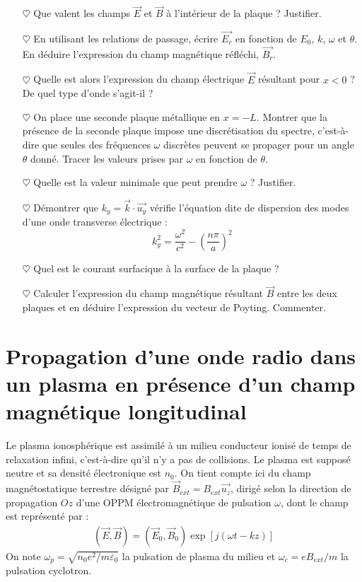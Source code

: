 \documentclass{report}
\begin{document}
\begin{itemize}
	
	\item[$\heartsuit$] Que valent les champs $\vec{E}$ et $\vec{B}$ à l'intérieur de la plaque ? Justifier.
	
	\item[$\heartsuit$] En utilisant les relations de passage, écrire $\vec{E_r}$ en fonction de $E_0$, $k$, $\omega$ et $\theta$. En déduire l'expression du champ magnétique réfléchi, $\vec{B_r}$.
	
	\item[$\heartsuit$] Quelle est alors l'expression du champ électrique $\vec{E}$ résultant pour $x<0$ ? De quel type d'onde s'agit-il ?
	
	\item[$\heartsuit$] 	On place une seconde plaque métallique en $x=-L$. Montrer que la présence de la seconde plaque impose une discrétisation du spectre, c'est-à-dire que seules des fréquences $\omega$ discrètes peuvent se propager pour un angle $\theta$ donné. Tracer les valeurs prises par $\omega$ en fonction de $\theta$. 
	\item[$\heartsuit$] Quelle est la valeur minimale que peut prendre $\omega$ ? Justifier. 
	
	\item[$\heartsuit$] Démontrer que $k_y=\vec{k}\cdot\vec{u_y}$ vérifie l'équation dite de dispersion des modes d'une onde transverse électrique : 
	\begin{equation}
		k_y^2=\frac{\omega^2}{c^2}-\left(\frac{n\pi}{a} \right)^2 
	\end{equation}
	
	\item[$\heartsuit$] Quel est le courant surfacique à la surface de la plaque ?
	
	\item[$\heartsuit$] Calculer l'expression du champ magnétique résultant $\vec{B}$ entre les deux plaques et en déduire l'expression du vecteur de Poyting. Commenter. 
	
\end{itemize}

\newpage

\section*{Propagation d'une onde radio dans un plasma en présence d'un champ magnétique longitudinal}

Le plasma ionosphérique est assimilé à un milieu conducteur ionisé de temps de relaxation infini, c'est-à-dire qu'il n'y a pas de collisions. Le plasma est supposé neutre et sa densité électronique est $n_0$. On tient compte ici du champ magnétostatique terrestre désigné par $\vec{B}_{ext}=B_{ext}\vec{u_z}$, dirigé selon la direction de propagation $Oz$ d'une OPPM électromagnétique de pulsation $\omega$, dont le champ est représenté par :
\begin{align*}
	(\vec{E},\vec{B})=(\vec{E}_0,\vec{B}_0)\exp[j(\omega t-kz)]
\end{align*}
On note $\omega_p=\sqrt{n_0e^2/m\varepsilon_0}$ la pulsation de plasma du milieu et $\omega_c=eB_{ext}/m$ la pulsation cyclotron. 
\end{document}
